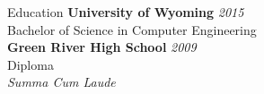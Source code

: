 \documentclass{resume} %
\begin{document}
	
\begin{rSection}{Education}
	{\bf University of Wyoming} \hfill {\em 2015} 
	\\ Bachelor of Science in Computer Engineering
\vspace{0.4em}
		\\ {\bf Green River High School} \hfill {\em 2009} 
		\\ Diploma
		\\ \emph{Summa Cum Laude}
\end{rSection}
\end{document}
